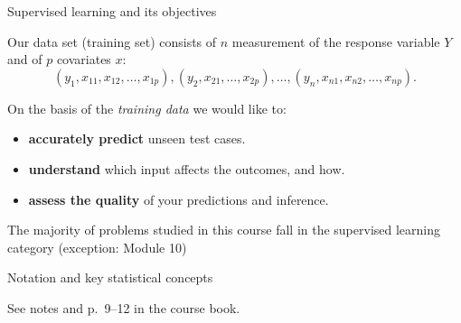 \documentclass[ignorenonframetext,]{beamer}
\begin{document}
\begin{frame}

\begin{block}{Supervised learning and its objectives}

\vspace{2mm}

Our data set (training set) consists of \(n\) measurement of the
response variable \(Y\) and of \(p\) covariates \(x\):
\[(y_1, x_{11}, x_{12},\ldots, x_{1p}), (y_2, x_{21},\ldots, x_{2p}), \ldots, (y_n, x_{n1}, x_{n2},\ldots, x_{np}).\]
\(~\)

On the basis of the \emph{training data} we would like to:

\begin{itemize}
\item
  \textbf{accurately predict} unseen test cases.
\item
  \textbf{understand} which input affects the outcomes, and how.
\item
  \textbf{assess the quality} of your predictions and inference.
\end{itemize}

\vspace{2mm}

The majority of problems studied in this course fall in the supervised
learning category (exception: Module 10)

\end{block}

\end{frame}

\begin{frame}{Notation and key statistical concepts}
\protect\hypertarget{notation-and-key-statistical-concepts}{}

See notes and p.~9--12 in the course book.

\vspace{6cm}

\end{frame}
\end{document}
